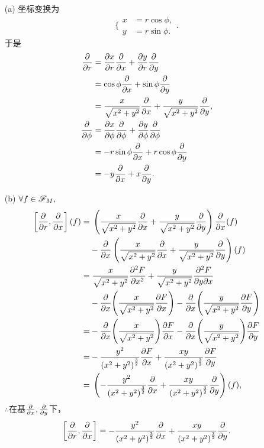 \begin{xiti}
    \begin{jie}
    	\begin{enumerate}
    		\item[(a)] 坐标变换为
    		\begin{equation*}
    		\Bigg\{
    		\begin{aligned}
    		x&=r \cos \phi,\\
    		y&=r \sin \phi.
    		\end{aligned}
    		\Bigg.
    		\end{equation*}
    		于是
    		\begin{align*}
    		\allowdisplaybreaks
    		\pdv{r}&=\pdv{x}{r}\pdv{x}+\pdv{y}{r}\pdv{y}\\
    		&=\cos \phi \pdv{x}+\sin \phi \pdv{y}\\
    		&=\frac{x}{\sqrt{x^2+y^2}} \pdv{x}+\frac{y}{\sqrt{x^2+y^2}}\pdv{y},\\
    		\pdv{\phi}&=\pdv{x}{\phi}\pdv{\phi}+\pdv{y}{\phi}\pdv{\phi}\\
    		&=-r\sin \phi \pdv{x}+r\cos \phi \pdv{y}\\
    		&=-y\pdv{x}+x\pdv{y}.
    		\end{align*}
    		\item[(b)] $\forall f\in \mathscr{F}_M,$
    		\begin{align*}
    		\allowdisplaybreaks
    		\left[\pdv{r},\pdv{x}\right](f)=&\;\left(\frac{x}{\sqrt{x^2+y^2}}\pdv{x}+\frac{y}{\sqrt{x^2+y^2}}\pdv{y}\right)\pdv{x}(f)\\
    		&-\pdv{x}\left(\frac{x}{\sqrt{x^2+y^2}}\pdv{x}+\frac{y}{\sqrt{x^2+y^2}}\pdv{y}\right)(f)\\
    		=&\;\frac{x}{\sqrt{x^2+y^2}}\pdv[2]{F}{x}+\frac{y}{\sqrt{x^2+y^2}}\pdv{F}{y}{x}\\
    		&-\pdv{x}(\frac{x}{\sqrt{x^2+y^2}}\pdv{F}{x})-\pdv{x}(\frac{y}{\sqrt{x^2+y^2}}\pdv{F}{y})\\
    		=&-\pdv{x}(\frac{x}{\sqrt{x^2+y^2}})\pdv{F}{x}-\pdv{x}(\frac{y}{\sqrt{x^2+y^2}})\pdv{F}{y}\\
    		=&-\frac{y^2}{\left(x^2+y^2\right)^{\frac{3}{2}}}\pdv{F}{x}+\frac{x y}{\left(x^2+y^2\right)^\frac{3}{2}}\pdv{F}{y}\\
    		=&\;\left(-\frac{y^2}{\left(x^2+y^2\right)^\frac{3}{2}}\pdv{x}+\frac{x y}{\left(x^2+y^2\right)^\frac{3}{2}}\pdv{y}\right)(f),
    		\end{align*}
    		$\therefore $在基$\pdv{x},\pdv{y}$下，
    		\begin{equation*}
    		\left[\pdv{r},\pdv{x}\right]=-\frac{y^2}{\left(x^2+y^2\right)^\frac{3}{2}}\pdv{x}+\frac{x y}{\left(x^2+y^2\right)^\frac{3}{2}}\pdv{y}.

\end{equation*}
\end{enumerate}
\end{jie}
\end{xiti}
